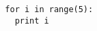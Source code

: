 \documentclass[10pt]{article}
\begin{document}
\begin{lstlisting}
  for i in range(5):
    print i
\end{lstlisting}
\end{document}
